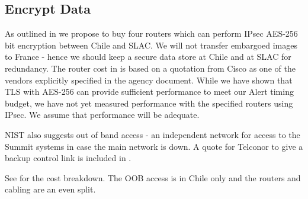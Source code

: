 \subsection{Encrypt Data} \label{sec:1encrypt}

As outlined in   we propose to buy four routers which can perform IPsec AES-256 bit encryption between Chile and SLAC.
We will not transfer embargoed images to France - hence we should keep a secure data store at Chile and at SLAC for redundancy.
The router cost in   is based on a quotation from Cisco as one of the vendors explicitly specified in the agency document.
While we have shown that TLS with AES-256 can provide sufficient performance to meet our Alert timing budget, we have not yet measured performance with the specified routers using IPsec.
We assume that performance will be adequate.

NIST also suggests out of band access - an independent network for access to the Summit systems in case the main network is down.
A quote for Telconor to give a backup control link is included in .

See  for the cost breakdown.  The OOB access is in Chile only and the routers and cabling are an even split.



